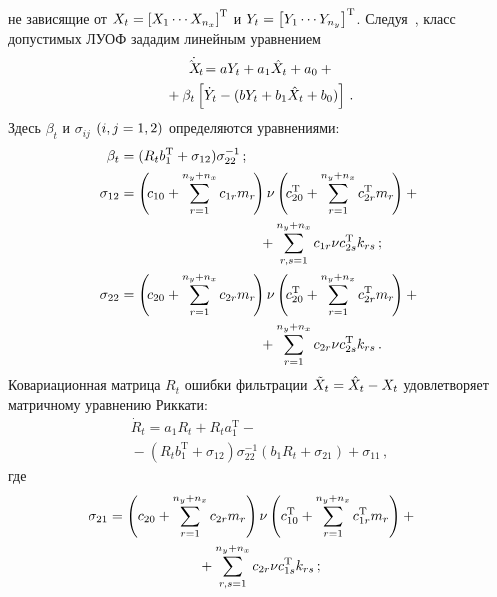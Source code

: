 \begin{multicols}{2}
не зависящие от
$X_t\hm=\lk X_1\cdots X_{n_x}\rk^{\mathrm{T}}$ и $Y_t \hm=\lk
Y_1\cdots Y_{n_y}\rk^{\mathrm{T}}$. Следуя~\cite{1-sk, 3-sk, 4-sk},
класс допустимых ЛУОФ зададим линейным уравнением
\begin{multline}
\dot{\hat X_t} =a Y_t +a_{1}\hat X_t + a_{0} +{}\\
{}+\beta_t \left[ \dot Y_t -
(b Y_t + b_{1}\hat X_t + b_{0})\right]\,.\label{e2.4-sk}
\end{multline}
Здесь $\beta_t$ и $\sigma_{ij}$ $(i,j\hm=1,2)$ определяются уравне\-ниями:
\begin{align}
\beta_t &= (R_t b_1^{\mathrm{T}} +\sigma_{12}) \sigma_{22}^{-1}\,;\notag\\ %
\sigma_{12}&=\left(\! c_{10} +\sss_{r=1}^{n_y+n_x} c_{1r} m_{r}\!\right) \nu
\left( \!c_{20}^{\mathrm{T}} +\sss_{r=1}^{n_y+n_x} c_{2r}^{\mathrm{T}} m_{r}\!\right)+{}\notag\\
&\hspace*{35mm}{}+\sss_{r,s=1}^{n_y+n_x} c_{1r}\nu c_{2s}^{\mathrm{T}}  k_{rs}\,; \notag\\ %
\sigma_{22}&=\left(\! c_{20} +\sss_{r=1}^{n_y+n_x} c_{2r} m_{r}\!\right)\nu
    \left(\! c_{20}^{\mathrm{T}} +\sss_{r=1}^{n_y+n_x} c_{2r}^{\mathrm{T}} m_{r}\!\right)+{}\notag\\
&\hspace*{35mm}{}+    \sss_{r=1}^{n_y+n_x} c_{2r}\nu c_{2s}^{\mathrm{T}} k_{rs}\,.\label{e2.7-sk}
    \end{align}
Ковариационная матрица  $R_t$ ошибки фильтрации
$\tilde X_t\hm=\hat X_t \hm-X_t$ удовлетворяет матричному уравнению Риккати:
\begin{multline}
\dot R_t = a_1 R_t + R_t a_1^{\mathrm{T}} - {}\\
{}-(R_t b_1^{\mathrm{T}} +\sigma_{12} )
\sigma_{22}^{-1} (b_1 R_t +\sigma_{21}) +\sigma_{11}\,,\label{e2.8-sk}
\end{multline}
где
\begin{multline*}
\hspace*{-9.60526pt}\sigma_{21}= \left( c_{20} +\sum\limits_{r=1}^{n_y+n_x} c_{2r} m_{r}\right)
     \nu  \left( c_{10}^{\mathrm{T}} +\sum\limits_{r=1}^{n_y+n_x} c_{1r}^{\mathrm{T}} m_{r}\right)+{}\\
{}+\sum\limits_{r,s=1}^{n_y+n_x} c_{2r}\nu c_{1s}^{\mathrm{T}} k_{rs}\,;
\end{multline*}



\end{multicols}

